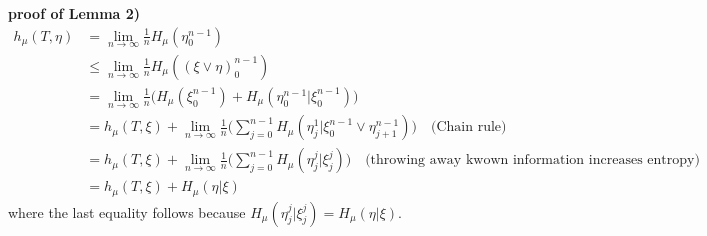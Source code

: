 \documentclass[10pt,a4paper]{report}
\newenvironment{proof}
{\begin{changemargin}{1cm}{0.5cm} 
	}%
	{\end{changemargin}
}
\begin{document}
\begin{proof}
\textbf{proof of Lemma 2)} \begin{align*}
h_{\mu}(T,\eta) &= \lim_{n\rightarrow \infty} \frac{1}{n} H_{\mu}(\eta^{n-1}_0) \\
& \leq \lim_{n\rightarrow \infty} \frac{1}{n} H_{\mu}((\xi \vee \eta)_0^{n-1}) \\
&= \lim_{n\rightarrow \infty} \frac{1}{n}\Big( H_{\mu}(\xi_0^{n-1}) + H_{\mu}(\eta_0^{n-1} | \xi_0^{n-1}) \Big) \\
&= h_{\mu}(T,\xi) + \lim_{n\rightarrow \infty} \frac{1}{n} \Big( \sum_{j=0}^{n-1} H_{\mu}(\eta_j^1 | \xi_0^{n-1} \vee \eta_{j+1}^{n-1})  \Big) \quad \text{(Chain rule)} \\ 
&= h_{\mu}(T,\xi) + \lim_{n\rightarrow \infty} \frac{1}{n} \Big( \sum_{j=0}^{n-1} H_{\mu} (\eta_j^j | \xi_j^j) \Big) \quad \text{(throwing away kwown information increases entropy)}\\
&= h_{\mu}(T, \xi) + H_{\mu}(\eta |\xi)
\end{align*}
where the last equality follows because $H_{\mu} (\eta_j^j | \xi_j^j) = H_{\mu}(\eta |\xi)$.

\eop
\end{proof}
\s
\end{document}
